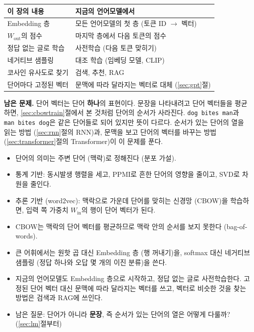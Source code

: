 \documentclass[11pt,a4paper]{article}
\newcommand{\w}[1]{\texttt{#1}}
\begin{document}
\begin{center}
\begin{tabular}{@{}p{38mm}p{100mm}@{}}
\toprule
이 장의 내용 & 지금의 언어모델에서 \\
\midrule
Embedding 층 & 모든 언어모델의 첫 층 (토큰 ID $\to$ 벡터) \\
$W_{\text{out}}$의 점수 & 마지막 층에서 다음 토큰의 점수 \\
정답 없는 글로 학습 & 사전학습 (다음 토큰 맞히기) \\
네거티브 샘플링 & 대조 학습 (임베딩 모델, CLIP) \\
코사인 유사도로 찾기 & 검색, 추천, RAG \\
단어마다 고정된 벡터 & 문맥에 따라 달라지는 벡터로 대체 (\ref{sec:gpt}절) \\
\bottomrule
\end{tabular}
\end{center}

\textbf{남은 문제.} 단어 벡터는 단어 \textbf{하나}의 표현이다. 문장을 나타내려고 단어 벡터들을 평균하면, \ref{sec:cbowtrain}절에서 본 것처럼 단어의 순서가 사라진다.
\w{dog bites man}과 \w{man bites dog}은 같은 단어들로 되어 있지만 뜻이 다르다.
순서가 있는 단어의 열을 읽는 방법 (\ref{sec:rnn}절의 RNN)과, 문맥을 보고 단어의 벡터를 바꾸는 방법 (\ref{sec:transformer}절의 Transformer)이 이 문제를 푼다.

\begin{mlbox}[1--4절 정리]
\begin{itemize}[leftmargin=1.5em]
\item 단어의 의미는 주변 단어 (맥락)로 정해진다 (분포 가설).
\item 통계 기반: 동시발생 행렬을 세고, PPMI로 흔한 단어의 영향을 줄이고, SVD로 차원을 줄인다.
\item 추론 기반 (word2vec): 맥락으로 가운데 단어를 맞히는 신경망 (CBOW)을 학습하면, 입력 쪽 가중치 $W_{\text{in}}$의 행이 단어 벡터가 된다.
\item CBOW는 맥락의 단어 벡터를 평균하므로 맥락 안의 순서를 보지 못한다 (bag-of-words).
\item 큰 어휘에서는 원핫 곱 대신 Embedding 층 (행 꺼내기)을, softmax 대신 네거티브 샘플링 (정답 하나와 오답 몇 개의 이진 분류)을 쓴다.
\item 지금의 언어모델도 Embedding 층으로 시작하고, 정답 없는 글로 사전학습한다. 고정된 단어 벡터 대신 문맥에 따라 달라지는 벡터를 쓰고, 벡터로 비슷한 것을 찾는 방법은 검색과 RAG에 쓰인다.
\item 남은 질문: 단어가 아니라 \textbf{문장}, 즉 순서가 있는 단어의 열은 어떻게 다룰까? (\ref{sec:lm}절부터)
\end{itemize}
\end{mlbox}
\end{document}
